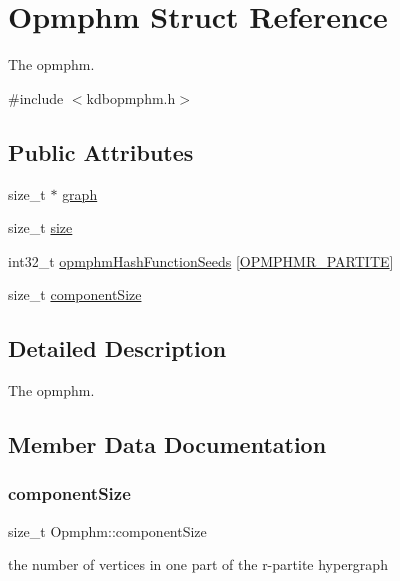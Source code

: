 \hypertarget{structOpmphm}{}\section{Opmphm Struct Reference}
\label{structOpmphm}


The opmphm.  




{\ttfamily \#include $<$kdbopmphm.\+h$>$}

\subsection*{Public Attributes}
\begin{DoxyCompactItemize}
\item 
size\+\_\+t $\ast$ \hyperlink{structOpmphm_a9e180e696384dedcd1e4a87d6f0739b1}{graph}
\item 
size\+\_\+t \hyperlink{structOpmphm_a72e7343b4ea87b27891e760f03fd2b96}{size}
\item 
int32\+\_\+t \hyperlink{structOpmphm_af43b9994fa7db2d16abc682b1a6c3aa3}{opmphm\+Hash\+Function\+Seeds} \mbox{[}\hyperlink{kdbopmphm_8h_ad241eace4050c6fcdab0da1919a79d93}{O\+P\+M\+P\+H\+M\+R\+\_\+\+P\+A\+R\+T\+I\+TE}\mbox{]}
\item 
size\+\_\+t \hyperlink{structOpmphm_a01441fc04bd56fd6253ca4265364d39c}{component\+Size}
\end{DoxyCompactItemize}


\subsection{Detailed Description}
The opmphm. 

\subsection{Member Data Documentation}
\mbox{\label{structOpmphm_a01441fc04bd56fd6253ca4265364d39c}} 
\subsubsection{\texorpdfstring{component\+Size}{componentSize}}
{\footnotesize\ttfamily size\+\_\+t Opmphm\+::component\+Size}

the number of vertices in one part of the r-\/partite hypergraph \mbox{\label{structOpmphm_a9e180e696384dedcd1e4a87d6f0739b1}} 
